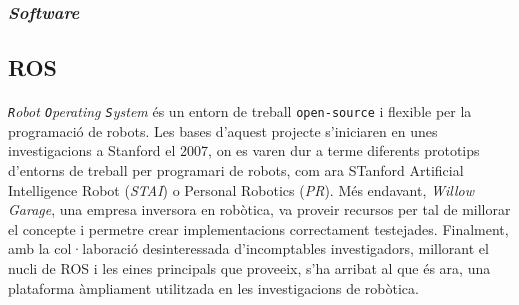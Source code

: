\documentclass[12pt,a4paper,final,twoside]{article}
\begin{document}


\label{Software}
\subsubsection{\textit{Software}}


  


\subsection{ROS}
\label{ROS}
\paragraph{}\textit{\texttt{R}obot \texttt{O}perating \texttt{S}ystem} \cite{ROS} és un entorn de treball \texttt{open-source} i flexible per la programació de robots. Les bases d'aquest projecte s'iniciaren en unes investigacions a Stanford el 2007, on es varen dur a terme diferents prototips d'entorns de treball per programari de robots, com ara STanford Artificial Intelligence Robot (\textit{STAI}) o Personal Robotics (\textit{PR}). Més endavant, \textit{Willow Garage}, una empresa inversora en robòtica, va proveir recursos per tal de millorar el concepte i permetre crear implementacions correctament testejades. Finalment, amb la col·laboració desinteressada d'incomptables investigadors, millorant el nucli de ROS i les eines principals que proveeix, s'ha arribat al que és ara, una plataforma àmpliament utilitzada en les investigacions de robòtica.
\end{document}
